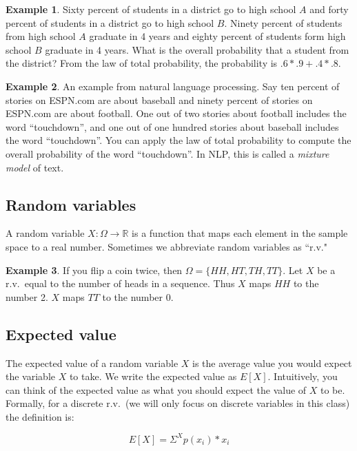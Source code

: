 \documentclass[]{article}
\theoremstyle{definition}
\newtheorem{exmp}{Example}[section]
\begin{document}
\begin{exmp}
Sixty percent of students in a district go to high school $A$ and forty percent of students in a district go to high school $B$. Ninety percent of students from high school $A$ graduate in 4 years and eighty percent of students form high school $B$ graduate in 4 years. What is the overall probability that a student from the district? From the law of total probability, the probability is $.6 * .9 + .4*.8$.
\end{exmp} 

\begin{exmp}
An example from natural language processing. Say ten percent of stories on ESPN.com are about baseball and ninety percent of stories on ESPN.com are about football. One out of two stories about football includes the word ``touchdown'', and one out of one hundred stories about baseball includes the word ``touchdown''. You can apply the law of total probability to compute the overall probability of the word ``touchdown''. In NLP, this is called a \textit{mixture model} of text.
\end{exmp} 

\subsection{Random variables}

A random variable $X: \Omega \rightarrow \mathbb{R}$ is a function that maps each element in the sample space to a real number. Sometimes we abbreviate random variables as ``r.v."

\begin{exmp}
If you flip a coin twice, then $\Omega = \{HH, HT, TH, TT\}$. Let $X$ be a r.v.\ equal to the number of heads in a sequence. Thus $X$ maps $HH$ to the number 2. $X$ maps $TT$ to the number 0.
\end{exmp} 

\subsection{Expected value}

The expected value of a random variable $X$ is the average value you would expect the variable $X$ to take. We write the expected value as $E[X]$. Intuitively, you can think of the expected value as what you should expect the value of $X$ to be. Formally, for a discrete r.v.\ (we will only focus on discrete variables in this class) the definition is: 

\begin{equation}
E[X] = \Sigma^X p(x_i) * x_i
\end{equation}
\end{document}
